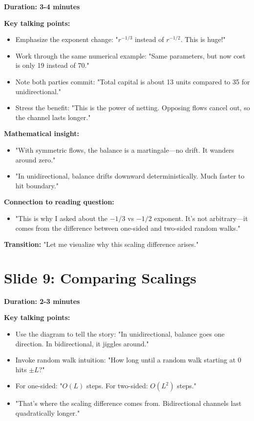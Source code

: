 \documentclass[11pt]{article}
\begin{document}
\textbf{Duration: 3-4 minutes}

\textbf{Key talking points:}
\begin{itemize}
    \item Emphasize the exponent change: "$r^{-1/3}$ instead of $r^{-1/2}$. This is huge!"
    \item Work through the same numerical example: "Same parameters, but now cost is only 19 instead of 70."
    \item Note both parties commit: "Total capital is about 13 units compared to 35 for unidirectional."
    \item Stress the benefit: "This is the power of netting. Opposing flows cancel out, so the channel lasts longer."
\end{itemize}

\textbf{Mathematical insight:}
\begin{itemize}
    \item "With symmetric flows, the balance is a martingale—no drift. It wanders around zero."
    \item "In unidirectional, balance drifts downward deterministically. Much faster to hit boundary."
\end{itemize}

\textbf{Connection to reading question:}
\begin{itemize}
    \item "This is why I asked about the $-1/3$ vs $-1/2$ exponent. It's not arbitrary—it comes from the difference between one-sided and two-sided random walks."
\end{itemize}

\textbf{Transition:} "Let me visualize why this scaling difference arises."

\section*{Slide 9: Comparing Scalings}

\textbf{Duration: 2-3 minutes}

\textbf{Key talking points:}
\begin{itemize}
    \item Use the diagram to tell the story: "In unidirectional, balance goes one direction. In bidirectional, it jiggles around."
    \item Invoke random walk intuition: "How long until a random walk starting at 0 hits $\pm L$?"
    \item For one-sided: "$O(L)$ steps. For two-sided: $O(L^2)$ steps."
    \item "That's where the scaling difference comes from. Bidirectional channels last quadratically longer."
\end{itemize}
\end{document}
